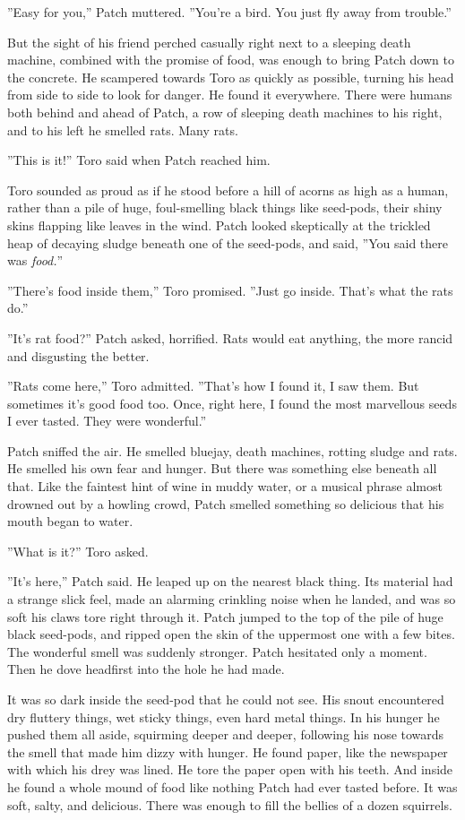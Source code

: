 \documentclass[12pt]{book}
\begin{document}
''Easy for you,'' Patch muttered. ''You're a bird. You just fly away
from trouble.''

But the sight of his friend perched casually right next to a sleeping
death machine, combined with the promise of food, was enough to bring
Patch down to the concrete. He scampered towards Toro as quickly as
possible, turning his head from side to side to look for danger. He
found it everywhere. There were humans both behind and ahead of Patch,
a row of sleeping death machines to his right, and to his left he
smelled rats. Many rats.

''This is it!'' Toro said when Patch reached him.

Toro sounded as proud as if he stood before a hill of acorns as high
as a human, rather than a pile of huge, foul-smelling black things
like seed-pods, their shiny skins flapping like leaves in the
wind. Patch looked skeptically at the trickled heap of decaying sludge
beneath one of the seed-pods, and said, ''You said there was
\textit{food.}''

''There's food inside them,'' Toro promised. ''Just go inside. That's
what the rats do.''

''It's rat food?'' Patch asked, horrified. Rats would eat anything,
the more rancid and disgusting the better.

''Rats come here,'' Toro admitted. ''That's how I found it, I saw
them. But sometimes it's good food too. Once, right here, I found the
most marvellous seeds I ever tasted. They were wonderful.''

Patch sniffed the air. He smelled bluejay, death machines, rotting
sludge and rats. He smelled his own fear and hunger. But there was
something else beneath all that. Like the faintest hint of wine in
muddy water, or a musical phrase almost drowned out by a howling
crowd, Patch smelled something so delicious that his mouth began to
water.

''What is it?'' Toro asked.

''It's here,'' Patch said. He leaped up on the nearest black
thing. Its material had a strange slick feel, made an alarming
crinkling noise when he landed, and was so soft his claws tore right
through it. Patch jumped to the top of the pile of huge black
seed-pods, and ripped open the skin of the uppermost one with a few
bites. The wonderful smell was suddenly stronger. Patch hesitated only
a moment. Then he dove headfirst into the hole he had made.

It was so dark inside the seed-pod that he could not see. His snout
encountered dry fluttery things, wet sticky things, even hard metal
things. In his hunger he pushed them all aside, squirming deeper and
deeper, following his nose towards the smell that made him dizzy with
hunger. He found paper, like the newspaper with which his drey was
lined. He tore the paper open with his teeth. And inside he found a
whole mound of food like nothing Patch had ever tasted before. It was
soft, salty, and delicious. There was enough to fill the bellies of a
dozen squirrels.
\end{document}
